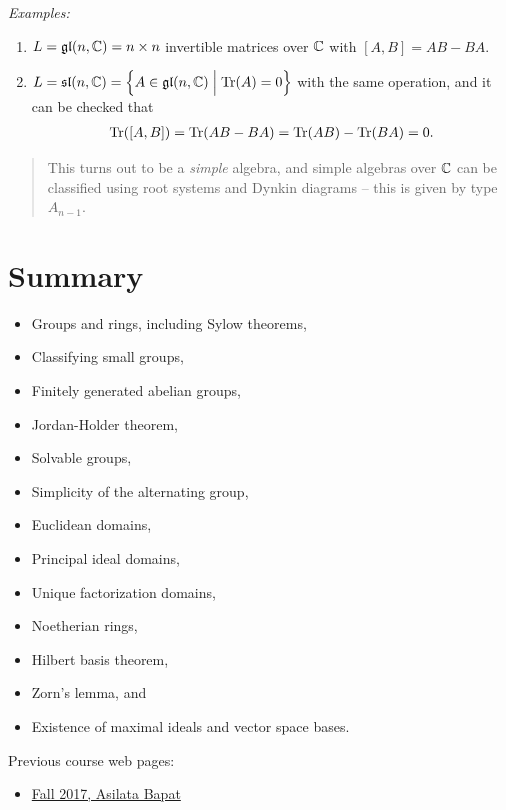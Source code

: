 \emph{Examples:}

\begin{enumerate}
\def\labelenumi{\arabic{enumi}.}
\item
  \(L = {\mathfrak{gl}}(n, {\mathbb{C}}) = n \times n\) invertible matrices over \({\mathbb{C}}\)
  with \([A, B] = AB - BA\).
\item
  \(L = {\mathfrak{sl}}(n, {\mathbb{C}}) = \left\{{A \in {\mathfrak{gl}}(n, {\mathbb{C}}) \mathrel{\Big|} \mathrm{Tr}(A) = 0}\right\}\)
  with the same operation, and it can be checked that
  \begin{align*}
  \mathrm{Tr}([A, B]) = \mathrm{Tr}(AB - BA) = \mathrm{Tr}(AB) - \mathrm{Tr}(BA) = 0
  .\end{align*}
\end{enumerate}

\begin{quote}
This turns out to be a \emph{simple} algebra, and simple algebras over
\({\mathbb{C}}\) can be classified using root systems and Dynkin diagrams -- this
is given by type \(A_{n-1}\).
\end{quote}

\hypertarget{summary}{%
\section{Summary}\label{summary}}

\begin{itemize}
\tightlist
\item
  Groups and rings, including Sylow theorems,
\item
  Classifying small groups,
\item
  Finitely generated abelian groups,
\item
  Jordan-Holder theorem,
\item
  Solvable groups,
\item
  Simplicity of the alternating group,
\item
  Euclidean domains,
\item
  Principal ideal domains,
\item
  Unique factorization domains,
\item
  Noetherian rings,
\item
  Hilbert basis theorem,
\item
  Zorn's lemma, and
\item
  Existence of maximal ideals and vector space bases.
\end{itemize}

Previous course web pages:

\begin{itemize}
\tightlist
\item
  \href{https://asilata.github.io/8000fall17/}{Fall 2017, Asilata Bapat}
\end{itemize}





